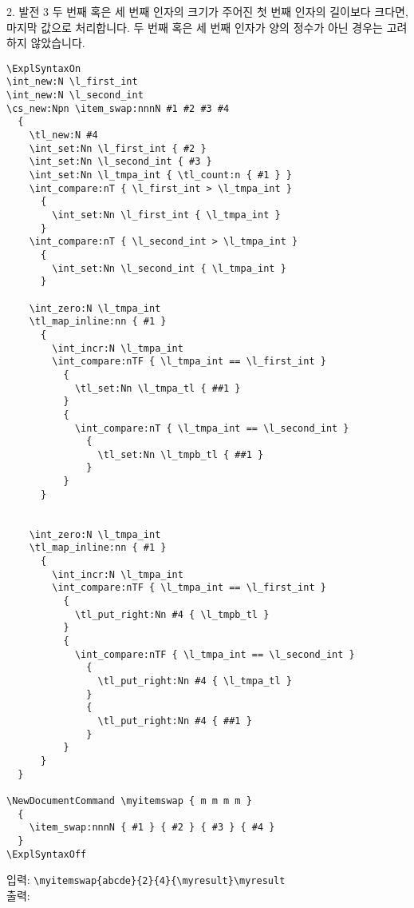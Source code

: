\documentclass[a4paper,amsmath,itemph]{oblivoir}
\begin{document}
\begin{questionp}{2. 발전 3}
  두 번째 혹은 세 번째 인자의 크기가 주어진 첫 번째 인자의 길이보다 크다면,
  마지막 값으로 처리합니다.
  두 번째 혹은 세 번째 인자가 양의 정수가 아닌 경우는 고려하지 않았습니다.

  \tcblower

  \begin{verbatim}
\ExplSyntaxOn
\int_new:N \l_first_int
\int_new:N \l_second_int
\cs_new:Npn \item_swap:nnnN #1 #2 #3 #4
  {
    \tl_new:N #4
    \int_set:Nn \l_first_int { #2 }
    \int_set:Nn \l_second_int { #3 }
    \int_set:Nn \l_tmpa_int { \tl_count:n { #1 } }
    \int_compare:nT { \l_first_int > \l_tmpa_int }
      {
        \int_set:Nn \l_first_int { \l_tmpa_int }
      }
    \int_compare:nT { \l_second_int > \l_tmpa_int }
      {
        \int_set:Nn \l_second_int { \l_tmpa_int }
      }

    \int_zero:N \l_tmpa_int
    \tl_map_inline:nn { #1 }
      {
        \int_incr:N \l_tmpa_int
        \int_compare:nTF { \l_tmpa_int == \l_first_int }
          {
            \tl_set:Nn \l_tmpa_tl { ##1 }
          }
          {
            \int_compare:nT { \l_tmpa_int == \l_second_int }
              {
                \tl_set:Nn \l_tmpb_tl { ##1 }
              }
          }
      }


    \int_zero:N \l_tmpa_int
    \tl_map_inline:nn { #1 }
      {
        \int_incr:N \l_tmpa_int
        \int_compare:nTF { \l_tmpa_int == \l_first_int }
          {
            \tl_put_right:Nn #4 { \l_tmpb_tl }
          }
          {
            \int_compare:nTF { \l_tmpa_int == \l_second_int }
              {
                \tl_put_right:Nn #4 { \l_tmpa_tl }
              }
              {
                \tl_put_right:Nn #4 { ##1 }
              }
          }
      }
  }

\NewDocumentCommand \myitemswap { m m m m }
  {
    \item_swap:nnnN { #1 } { #2 } { #3 } { #4 }
  }
\ExplSyntaxOff
  \end{verbatim}

  \begin{tcolorbox}{}
    입력: \verb|\myitemswap{abcde}{2}{4}{\myresult}\myresult|\\
    출력: \myresult
  \end{tcolorbox}
\end{questionp}
\end{document}
